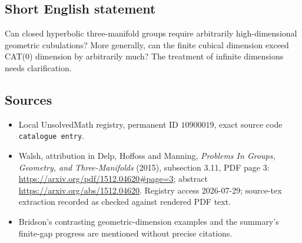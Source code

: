 \documentclass[11pt]{article}
\begin{document}
\subsection{Short English statement}
Can closed hyperbolic three-manifold groups require arbitrarily high-dimensional geometric cubulations? More generally, can the finite cubical dimension exceed CAT(0) dimension by arbitrarily much? The treatment of infinite dimensions needs clarification.
\subsection{Sources}
\begin{itemize}
\item Local UnsolvedMath registry, permanent ID \(10900019\), exact source code \texttt{catalogue entry}.
\item Walsh, attribution in Delp, Hoffoss and Manning, \emph{Problems In Groups, Geometry, and Three-Manifolds} (2015), subsection 3.11, PDF page 3: \url{https://arxiv.org/pdf/1512.04620#page=3}; abstract \url{https://arxiv.org/abs/1512.04620}. Registry access 2026-07-29; source-tex extraction recorded as checked against rendered PDF text.
\item Bridson's contrasting geometric-dimension examples and the summary's finite-gap progress are mentioned without precise citations.
\end{itemize}
\end{document}
